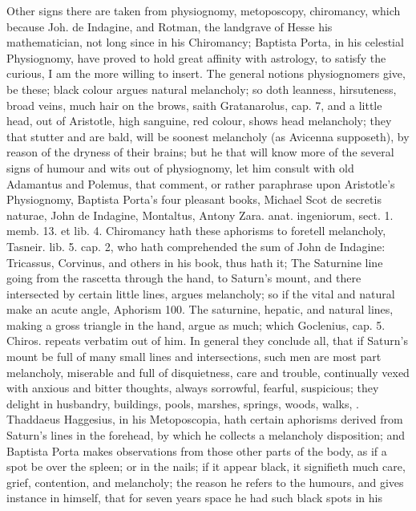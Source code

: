 {{Other signs there are taken from physiognomy, metoposcopy, chiromancy,
which because Joh. de Indagine, and Rotman, the landgrave of Hesse his
mathematician, not long since in his Chiromancy; Baptista Porta, in his
celestial Physiognomy, have proved to hold great affinity with
astrology, to satisfy the curious, I am the more willing to insert.
The general notions physiognomers give, be these; black colour
argues natural melancholy; so doth leanness, hirsuteness, broad veins,
much hair on the brows, saith Gratanarolus, cap. 7, and a little
head, out of Aristotle, high sanguine, red colour, shows head
melancholy; they that stutter and are bald, will be soonest melancholy (as Avicenna supposeth), by reason of the dryness of their brains; but
he that will know more of the several signs of humour and wits out of
physiognomy, let him consult with old Adamantus and Polemus, that
comment, or rather paraphrase upon Aristotle's Physiognomy, Baptista
Porta's four pleasant books, Michael Scot de secretis naturae, John de
Indagine, Montaltus, Antony Zara. anat. ingeniorum, sect. 1. memb. 13.
et lib. 4. Chiromancy hath these aphorisms to foretell melancholy, Tasneir. lib.
5. cap. 2, who hath comprehended the sum of John de Indagine:
Tricassus, Corvinus, and others in his book, thus hath it; The
Saturnine line going from the rascetta through the hand, to Saturn's
mount, and there intersected by certain little lines, argues
melancholy; so if the vital and natural make an acute angle, Aphorism
100. The saturnine, hepatic, and natural lines, making a gross triangle
in the hand, argue as much; which Goclenius, cap. 5. Chiros. repeats
verbatim out of him. In general they conclude all, that if Saturn's
mount be full of many small lines and intersections, such men are
most part melancholy, miserable and full of disquietness, care and
trouble, continually vexed with anxious and bitter thoughts, always
sorrowful, fearful, suspicious; they delight in husbandry, buildings,
pools, marshes, springs, woods, walks, \etc{}. Thaddaeus Haggesius, in his
Metoposcopia, hath certain aphorisms derived from Saturn's lines in the
forehead, by which he collects a melancholy disposition; and
Baptista Porta makes observations from those other parts of the
body, as if a spot be over the spleen; or in the nails; if it
appear black, it signifieth much care, grief, contention, and
melancholy; the reason he refers to the humours, and gives instance in
himself, that for seven years space he had such black spots in his
}}
